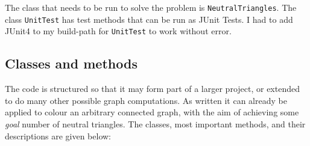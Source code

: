 \documentclass[letterpaper,10pt]{article}
\def\code#1{\texttt{#1}}
\begin{document}
The class that needs to be run to solve the problem 
is \code{NeutralTriangles}.  The class \code{UnitTest} has test methods that can be run as JUnit Tests.  I had to add JUnit4 to my build-path 
for \code{UnitTest} to work without error.

\subsection{Classes and methods}
The code is structured so that it may form part of a larger project, or extended to do many other possible graph computations.  
As written it can already be applied to colour an arbitrary connected  graph, with the aim of achieving some \textit{goal} number of neutral triangles.
The classes, most important methods, and their descriptions are given below:
\end{document}
